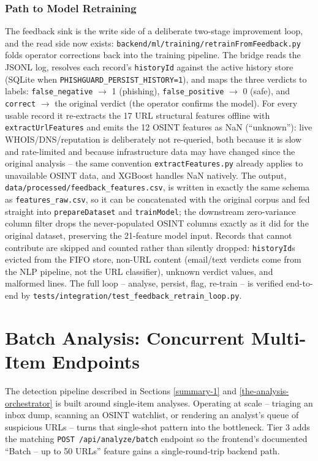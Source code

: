 \subsubsection{Path to Model Retraining}

The feedback sink is the write side of a deliberate two-stage improvement loop, and the read side now exists: \texttt{backend/ml/training/retrainFromFeedback.py} folds operator corrections back into the training pipeline.  The bridge reads the JSONL log, resolves each record's \texttt{historyId} against the active history store (SQLite when \texttt{PHISHGUARD\_PERSIST\_HISTORY=1}), and maps the three verdicts to labels: \texttt{false\_negative} $\rightarrow$ 1 (phishing), \texttt{false\_positive} $\rightarrow$ 0 (safe), and \texttt{correct} $\rightarrow$ the original verdict (the operator confirms the model).  For every usable record it re-extracts the 17 URL structural features offline with \texttt{extractUrlFeatures} and emits the 12 OSINT features as NaN (``unknown''): live WHOIS/DNS/reputation is deliberately not re-queried, both because it is slow and rate-limited and because infrastructure data may have changed since the original analysis -- the same convention \texttt{extractFeatures.py} already applies to unavailable OSINT data, and XGBoost handles NaN natively.  The output, \texttt{data/processed/feedback\_features.csv}, is written in exactly the same schema as \texttt{features\_raw.csv}, so it can be concatenated with the original corpus and fed straight into \texttt{prepareDataset} and \texttt{trainModel}; the downstream zero-variance column filter drops the never-populated OSINT columns exactly as it did for the original dataset, preserving the 21-feature model input.  Records that cannot contribute are skipped and counted rather than silently dropped: \texttt{historyId}s evicted from the FIFO store, non-URL content (email/text verdicts come from the NLP pipeline, not the URL classifier), unknown verdict values, and malformed lines.  The full loop -- analyse, persist, flag, re-train -- is verified end-to-end by \texttt{tests/integration/test\_feedback\_retrain\_loop.py}.

\section{Batch Analysis: Concurrent Multi-Item Endpoints}\label{batch-analysis}

The detection pipeline described in Sections \ref{summary-1} and
\ref{the-analysis-orchestrator} is built around single-item
analyses.  Operating at scale -- triaging an inbox dump, scanning
an OSINT watchlist, or rendering an analyst's queue of suspicious
URLs -- turns that single-shot pattern into the bottleneck.  Tier 3
adds the matching \texttt{POST \hspace{0pt}/api/analyze/batch}
endpoint so the frontend's documented ``Batch -- up to 50 URLs''
feature gains a single-round-trip backend path.

